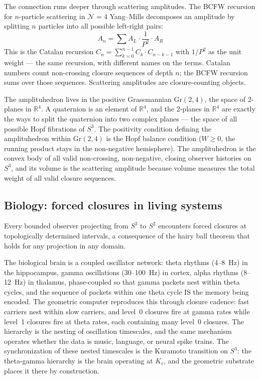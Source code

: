 \documentclass[12pt,a4paper]{article}
\theoremstyle{definition}
\theoremstyle{remark}
\begin{document}
The connection runs deeper through scattering amplitudes. The BCFW recursion
for $n$-particle scattering in $\mathcal{N}=4$ Yang--Mills decomposes an
amplitude by splitting $n$ particles into all possible left-right pairs:
\[
  A_n = \sum A_L \cdot \frac{1}{P^2} \cdot A_R
\]
This is the Catalan recursion
$C_n = \sum_{k=0}^{n-1} C_k \cdot C_{n-k-1}$ with $1/P^2$ as the unit
weight --- the same recursion, with different names on the terms.
Catalan numbers count non-crossing closure sequences of depth $n$; the BCFW
recursion sums over those sequences. Scattering amplitudes are
closure-counting objects.

The amplituhedron lives in the positive Grassmannian $\mathrm{Gr}(2,4)$, the
space of 2-planes in $\mathbb{R}^4$. A quaternion is an element of
$\mathbb{R}^4$, and the 2-planes in $\mathbb{R}^4$ are exactly the ways to
split the quaternion into two complex planes --- the space of all possible
Hopf fibrations of $S^3$. The positivity condition defining the amplituhedron
within $\mathrm{Gr}(2,4)$ is the Hopf balance condition ($W \geq 0$, the
running product stays in the non-negative hemisphere). The amplituhedron is
the convex body of all valid non-crossing, non-negative, closing observer
histories on $S^3$, and its volume is the scattering amplitude because volume
measures the total weight of all valid closure sequences.

\subsection{Biology: forced closures in living systems}

Every bounded observer projecting from $S^3$ to $S^2$ encounters forced
closures at topologically determined intervals, a consequence of the hairy
ball theorem that holds for any projection in any domain.

The biological brain is a coupled oscillator network: theta rhythms (4--8~Hz)
in the hippocampus, gamma oscillations (30--100~Hz) in cortex, alpha rhythms
(8--12~Hz) in thalamus, phase-coupled so that gamma packets nest within theta
cycles, and the sequence of packets within one theta cycle IS the memory being
encoded. The geometric computer reproduces this through closure cadence: fast
carriers nest within slow carriers, and level~0 closures fire at gamma rates
while level~1 closures fire at theta rates, each containing many level~0
closures. The hierarchy is the nesting of oscillation timescales, and the same
mechanism operates whether the data is music, language, or neural spike trains.
The synchronization of these nested timescales is the Kuramoto transition on
$S^3$: the theta-gamma hierarchy is the brain operating at $K_c$, and the
geometric substrate places it there by construction.
\end{document}
